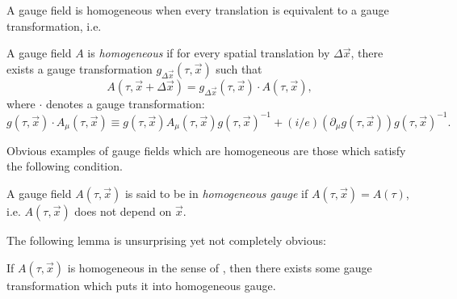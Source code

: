 A gauge field is homogeneous when every translation is equivalent to a gauge transformation, i.e.
\begin{defn}
\label{def:homogeneous}A gauge field $A$ is \emph{homogeneous} if for every spatial translation by $\Delta\vec{x}$, there exists a gauge transformation $g_{\Delta\vec{x}}(\tau,\vec{x})$ such that 
\begin{equation}
A(\tau,\vec{x}+\Delta\vec{x})=g_{\Delta\vec{x}}(\tau,\vec{x})\cdot A(\tau,\vec{x}),\label{eq:homogeneous-definition}
\end{equation}
where $\cdot$ denotes a gauge transformation: 
\begin{equation}
g(\tau,\vec{x})\cdot A_{\mu}(\tau,\vec{x})\equiv g(\tau,\vec{x})A_{\mu}(\tau,\vec{x})g(\tau,\vec{x})^{-1}+(i/e)\left(\partial_{\mu}g(\tau,\vec{x})\right)g(\tau,\vec{x})^{-1}.\label{eq:gauge-formula}
\end{equation}
\end{defn}

Obvious examples of gauge fields which are homogeneous are those which satisfy the following condition.
\begin{defn}
\label{def:homogeneous-gauge}A gauge field $A(\tau,\vec{x})$ is said to be in \emph{homogeneous gauge} if $A(\tau,\vec{x})=A(\tau)$, i.e. $A(\tau,\vec{x})$ does not depend on $\vec{x}$.
\end{defn}

The following lemma is unsurprising yet not completely obvious:
\begin{lem}
\label{lem:homogeneous}If $A(\tau,\vec{x})$ is homogeneous in the sense of , then there exists some gauge transformation which puts it into homogeneous gauge.
\end{lem}

